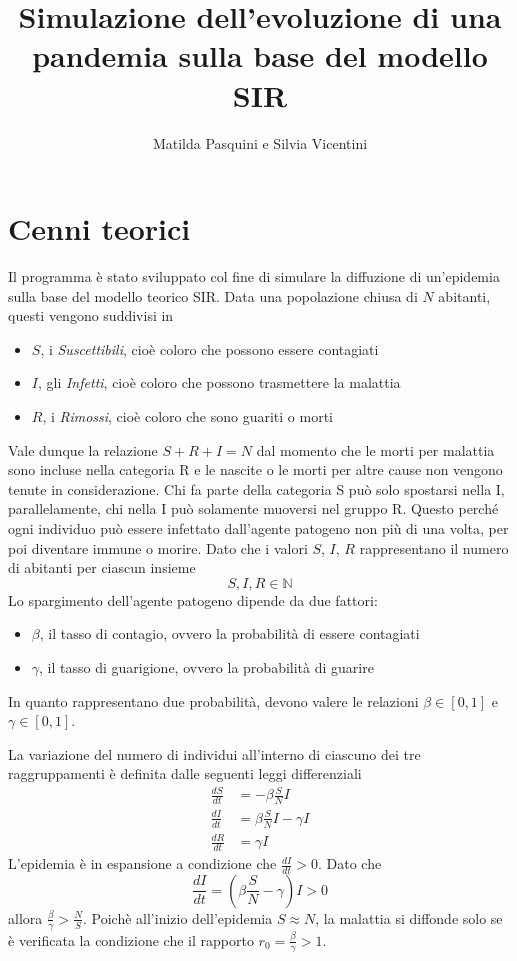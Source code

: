 \documentclass[11pt, a4paper]{article}
\title{Simulazione dell'evoluzione di una pandemia sulla base del modello SIR}
\author{Matilda Pasquini e Silvia Vicentini}
\begin{document}
\maketitle

\section{Cenni teorici}
Il programma \`{e} stato sviluppato col fine di simulare la diffuzione di 
un'epidemia sulla base del modello teorico SIR. Data una popolazione chiusa di 
$N$ abitanti, questi vengono suddivisi in
\begin{itemize}
\item $S$, i \textit{Suscettibili}, cio\`{e} coloro che possono essere contagiati
\item $I$, gli \textit{Infetti}, cio\`{e} coloro che possono trasmettere la malattia
\item $R$, i \textit{Rimossi}, cio\`{e} coloro che sono guariti o morti
\end{itemize}
Vale dunque la relazione $S+R+I=N$ dal momento che le morti per malattia sono 
incluse nella categoria R e le nascite o le morti per altre cause non vengono 
tenute in considerazione. Chi fa parte della categoria S pu\`{o} solo spostarsi 
nella I, parallelamente, chi nella I pu\`{o} solamente muoversi nel gruppo R. 
Questo perch\'e ogni individuo pu\`{o} essere infettato dall'agente patogeno 
non pi\`{u} di una volta, per poi diventare immune o morire. Dato che i valori 
$S$, $I$, $R$ rappresentano il numero di abitanti per ciascun insieme 
\[S, I, R \in \mathbb{N}\]
Lo spargimento dell'agente patogeno dipende da due fattori:
\begin{itemize}
\item \textit{$\beta$}, il tasso di contagio, ovvero la probabilit\`{a} di
essere contagiati
\item \textit{$\gamma$}, il tasso di guarigione, ovvero la probabilit\`{a} di 
guarire
\end{itemize}
In quanto rappresentano due probabilit\`{a}, devono valere le relazioni $\beta \in [0, 1]$ e $\gamma \in [0, 1]$.

La variazione del numero di individui all'interno di ciascuno dei tre 
raggruppamenti \`{e} definita dalle seguenti leggi differenziali
\begin{align*} 
\frac{dS}{dt} &= -\beta\frac{S}{N}I  \\
\frac{dI}{dt} &= \beta\frac{S}{N}I-\gamma I \\
\frac{dR}{dt} &= \gamma I 
\end{align*}
L'epidemia \`{e} in espansione a condizione che $\frac{dI}{dt} > 0$. 
Dato che \[\frac{dI}{dt}=(\beta\frac{S}{N}-\gamma) I>0\] 
allora $\frac{\beta}{\gamma}>\frac{N}{S}$. Poich\`{e} all'inizio dell'epidemia 
$S\approx N$, la malattia si diffonde solo se \`{e} verificata la condizione 
che il rapporto $r_0=\frac{\beta}{\gamma}>1$. \\
\end{document}
